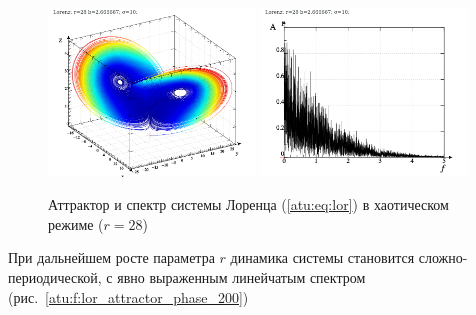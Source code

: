 \begin{figure}[ht!]
\begin{center}
  \includegraphics[width=0.49\textwidth]{p/cha/lor/lor0-p_xyz_r=028.png}
  \hfill
  \includegraphics[width=0.49\textwidth]{p/cha/lor/lor0_fft-p_f_r=028.png}
\end{center}
  \caption{Аттрактор и спектр системы Лоренца (\ref{atu:eq:lor}) в хаотическом режиме ($r=28$)}
\label{atu:f:lor_attractor_phase_chaos28}
\end{figure}

При дальнейшем росте параметра $r$ динамика системы становится
сложно-периодической, с явно выраженным линейчатым спектром
(рис.~\ref{atu:f:lor_attractor_phase_200})

